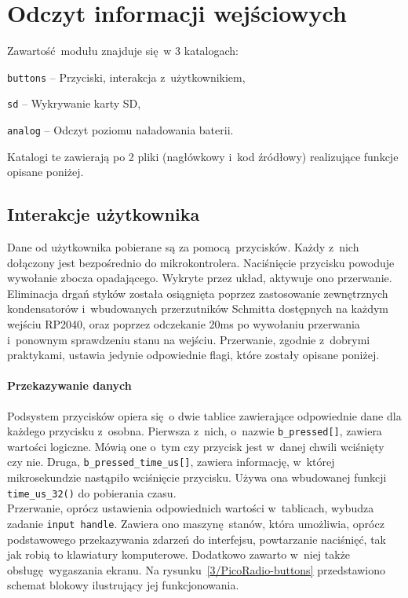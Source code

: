 \documentclass[polish]{aghengthesis}
\let\tempone\itemize
\let\temptwo\enditemize
\renewenvironment{itemize}{\tempone\setlength{\itemsep}{0cm}}{\temptwo}
\begin{document}
	\section{Odczyt informacji wejściowych}
		\noindent
		Zawartość modułu znajduje się w 3 katalogach:
		\begin{itemize}
			\item \lstinline|buttons| -- Przyciski, interakcja z~użytkownikiem,
			\item \lstinline|sd| -- Wykrywanie karty SD,
			\item \lstinline|analog| -- Odczyt poziomu naładowania baterii.
		\end{itemize}
		
		Katalogi te zawierają po 2 pliki (nagłówkowy i~kod źródłowy) realizujące funkcje opisane poniżej.
		
		\subsection{Interakcje użytkownika}
			Dane od użytkownika pobierane są za pomocą przycisków. Każdy z~nich dołączony jest bezpośrednio do mikrokontrolera. Naciśnięcie przycisku powoduje wywołanie zbocza opadającego. Wykryte przez układ, aktywuje ono przerwanie. Eliminacja drgań styków została osiągnięta poprzez zastosowanie zewnętrznych kondensatorów i~wbudowanych przerzutników Schmitta dostępnych na każdym wejściu RP2040, oraz poprzez odczekanie 20ms po wywołaniu przerwania i~ponownym sprawdzeniu stanu na wejściu. Przerwanie, zgodnie z~dobrymi praktykami, ustawia jedynie odpowiednie flagi, które zostały opisane poniżej.
			
			\paragraph{Przekazywanie danych}
				Podsystem przycisków opiera się o dwie tablice zawierające odpowiednie dane dla każdego przycisku z~osobna. Pierwsza z~nich, o~nazwie \lstinline|b_pressed[]|, zawiera wartości logiczne. Mówią one o~tym czy przycisk jest w~danej chwili wciśnięty czy nie. Druga, \lstinline|b_pressed_time_us[]|, zawiera informację, w~której mikrosekundzie nastąpiło wciśnięcie przycisku. Używa ona wbudowanej funkcji \lstinline|time_us_32()| do pobierania czasu.
			$ $\\
			
			Przerwanie, oprócz ustawienia odpowiednich wartości w~tablicach, wybudza zadanie \lstinline|input handle|. Zawiera ono maszynę stanów, która umożliwia, oprócz podstawowego przekazywania zdarzeń do interfejsu, powtarzanie naciśnięć, tak jak robią to klawiatury komputerowe. Dodatkowo zawarto w~niej także obsługę wygaszania ekranu. Na rysunku~\ref{3/PicoRadio-buttons} przedstawiono schemat blokowy ilustrujący jej funkcjonowania.
			
\end{document}
